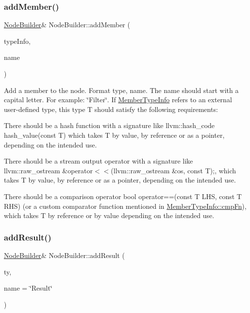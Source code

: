 \subsubsection{\texorpdfstring{add\+Member()}{addMember()}\hspace{0.1cm}{\footnotesize\ttfamily [2/2]}}
{\footnotesize\ttfamily \hyperlink{class_node_builder}{Node\+Builder}\& Node\+Builder\+::add\+Member (\begin{DoxyParamCaption}\item[{\hyperlink{struct_member_type_info}{Member\+Type\+Info}}]{type\+Info,  }\item[{const std\+::string \&}]{name }\end{DoxyParamCaption})\hspace{0.3cm}{\ttfamily [inline]}}

Add a member to the node. Format type, name. The name should start with a capital letter. For example\+: \char`\"{}\+Filter\char`\"{}. If \hyperlink{struct_member_type_info}{Member\+Type\+Info} refers to an external user-\/defined type, this type T should satisfy the following requirements\+:
\begin{DoxyItemize}
\item There should be a hash function with a signature like {\ttfamily llvm\+::hash\+\_\+code hash\+\_\+value(const T)} which takes T by value, by reference or as a pointer, depending on the intended use.
\item There should be a stream output operator with a signature like {\ttfamily llvm\+::raw\+\_\+ostream \&operator$<$$<$(llvm\+::raw\+\_\+ostream \&os, const T);}, which takes T by value, by reference or as a pointer, depending on the intended use.
\item There should be a comparison operator {\ttfamily bool operator==(const T L\+HS, const T R\+HS)} (or a custom comparator function mentioned in \hyperlink{struct_member_type_info_abf6a66ee80b0f3680c6bd0b86d61a858}{Member\+Type\+Info\+::cmp\+Fn}), which takes T by reference or by value depending on the intended use. 
\end{DoxyItemize}\mbox{\label{class_node_builder_a605fddc6415045aba18d5756ff9739f7}} 
\subsubsection{\texorpdfstring{add\+Result()}{addResult()}}
{\footnotesize\ttfamily \hyperlink{class_node_builder}{Node\+Builder}\& Node\+Builder\+::add\+Result (\begin{DoxyParamCaption}\item[{const std\+::string \&}]{ty,  }\item[{const std\+::string \&}]{name = {\ttfamily \char`\"{}Result\char`\"{}} }\end{DoxyParamCaption})\hspace{0.3cm}{\ttfamily [inline]}}

